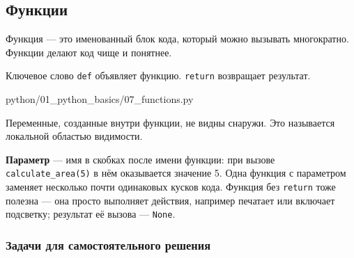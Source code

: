 \subsection{Функции}

Функция — это именованный блок кода, который можно вызывать многократно. Функции делают код чище и понятнее.

Ключевое слово \texttt{def} объявляет функцию. \texttt{return} возвращает результат.

\begin{codefile}[python]{python/01_python_basics/07_functions.py}
\end{codefile}

\begin{infobox}
Переменные, созданные внутри функции, не видны снаружи. Это называется локальной областью видимости.
\end{infobox}

\textbf{Параметр} --- имя в скобках после имени функции: при вызове \texttt{calculate\_area(5)} в нём оказывается значение 5. Одна функция с параметром заменяет несколько почти одинаковых кусков кода. Функция без \texttt{return} тоже полезна --- она просто выполняет действия, например печатает или включает подсветку; результат её вызова --- \texttt{None}.

\subsubsection*{Задачи для самостоятельного решения}

